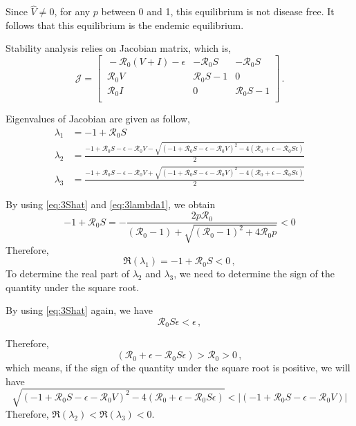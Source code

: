 \documentclass[12pt]{article}
\newcommand{\R}{\mathcal{R}}
\begin{document}
Since $\hat{V}\neq 0$, for any $p$ between 0 and 1, this equilibrium is not disease free. It follows that this equilibrium is the endemic equilibrium.

Stability analysis relies on Jacobian matrix, which is,
\begin{equation}
\mathcal{J} =
\begin{bmatrix}
    \ -\R_0 (V+I)-\epsilon       & -\R_0 S     &-\R_0 S\\
    \ \R_0 V       & \R_0 S-1    &0\\
    \ \R_0 I       &0     &\R_0 S-1\\
\end{bmatrix}\,.
\end{equation}

Eigenvalues of Jacobian are given as follow,
\begin{subequations}
\begin{align}
\lambda_1&=-1+\R_0 S \label{eq:3lambda1}\\
\lambda_2&=\frac{-1+\R_0 S-\epsilon-\R_0 V-\sqrt{(-1+\R_0 S-\epsilon-\R_0 V)^2-4(\R_0+\epsilon-\R_0 S\epsilon)}}{2} \label{eq:lambda2}\\
\lambda_3&=\frac{-1+\R_0 S-\epsilon-\R_0 V+\sqrt{(-1+\R_0 S-\epsilon-\R_0 V)^2-4(\R_0+\epsilon-\R_0 S\epsilon)}}{2}\label{eq:lambda3}
\end{align}
\end{subequations}

By using \autoref{eq:3Shat} and \autoref{eq:3lambda1}, we obtain
\begin{equation}
-1+\R_0 S = - \frac{2p\R_0}{(\R_0 -1)+ \sqrt{(\R_0-1)^2+4\R_0 p}}<0
\end{equation}
Therefore,
\begin{equation}
\Re(\lambda_1) =-1+\R_0 S<0\,,
\end{equation}
To determine the real part of $\lambda_2$ and $\lambda_3$, we need to determine the sign of the quantity under the square root. 

By using \autoref{eq:3Shat} again, we have
\begin{equation}
\R_0 S\epsilon<\epsilon\,,
\end{equation}

Therefore,
\begin{equation}
(\R_0+\epsilon-\R_0 S\epsilon)>\R_0 >0\,,
\end{equation}
which means, if the sign of the quantity under the square root is positive, we will have
\begin{equation}
\sqrt{(-1+\R_0 S-\epsilon-\R_0 V)^2-4(\R_0+\epsilon-\R_0 S\epsilon)}<|(-1+\R_0 S-\epsilon-\R_0 V)|
\end{equation}
Therefore, $\Re(\lambda_2)<\Re(\lambda_3)<0$.
\end{document}
